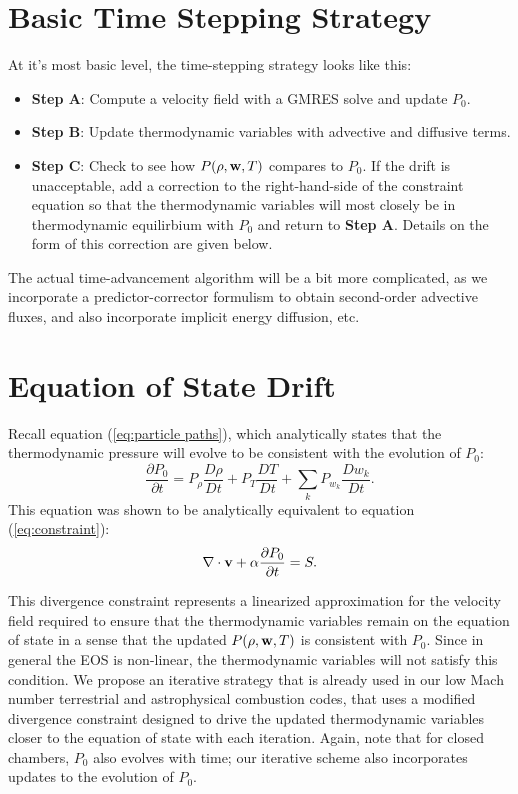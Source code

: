 \documentclass[final]{siamltex}
\def\vb {{\bf v}}
\def\wb {{\bf w}}
\begin{document}
\section{Basic Time Stepping Strategy}
At it's most basic level, the time-stepping strategy looks like this:\\
\begin{itemize}
\item {\bf Step A}: Compute a velocity field with a GMRES solve and update $P_0$.\\
\item {\bf Step B}: Update thermodynamic variables with advective and diffusive terms.\\
\item {\bf Step C}: Check to see how $P(\rho,\wb,T)$ compares to $P_0$.  If the drift 
is unacceptable, add a correction to the right-hand-side of the constraint equation 
so that the thermodynamic variables will most closely be in thermodynamic 
equilirbium with $P_0$ and return to {\bf Step A}.  Details on the form of this 
correction are given below.\\
\end{itemize}
The actual time-advancement algorithm will be a bit more complicated, as we 
incorporate a predictor-corrector formulism to obtain second-order advective 
fluxes, and also incorporate implicit energy diffusion, etc.

\section{Equation of State Drift}
Recall equation (\ref{eq:particle paths}), which analytically states that the 
thermodynamic pressure will evolve to be consistent with the evolution of $P_0$:
\begin{equation}
\frac{\partial P_0}{\partial t} = P_\rho\frac{D\rho}{Dt} + P_T\frac{DT}{Dt} + \sum_kP_{w_k}\frac{Dw_k}{Dt}.
\end{equation}
This equation was shown to be analytically equivalent to equation (\ref{eq:constraint}):
\begin{equation}
\nabla\cdot\vb + \alpha\frac{\partial P_0}{\partial t} = S.
\end{equation}

This divergence constraint represents a linearized approximation for the velocity 
field required to ensure that the thermodynamic variables remain on the equation 
of state in a sense that the updated $P(\rho,\wb,T)$ is consistent with $P_0$.
Since in general the EOS is non-linear, the thermodynamic variables will not
satisfy this condition.  We propose an iterative strategy that is already
used in our low Mach number terrestrial and astrophysical combustion codes, that
uses a modified divergence constraint designed to drive the updated 
thermodynamic variables closer to the equation of state with each iteration.
Again, note that for closed chambers, $P_0$ also evolves with time; our iterative
scheme also incorporates updates to the evolution of $P_0$.\\
\end{document}
